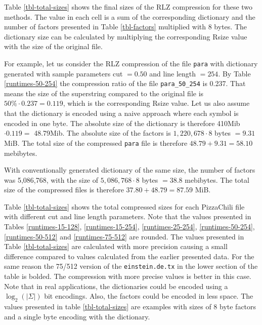 \documentclass[english,twoside,censored,csm,algorithms-track-2020]{HYthesisML}
\theoremstyle{plain}
\theoremstyle{definition}
\numberwithin{testexample}{chapter}
\begin{document}
\vspace{-1cm}
Table \ref{tbl-total-sizes} shows
the final sizes of the RLZ compression for these two methods. The value in each cell is a sum of
the corresponding dictionary and the number of factors presented in Table \ref{tbl-factors} multiplied
with 8 bytes. The dictionary size can be calculated by multiplying the corresponding Rsize value with
the size of the original file.

For example, let us consider the RLZ compression of the file \texttt{para} with dictionary
generated with sample
parameters cut $= 0.50$ and line length $= 254$.
By Table \ref{runtimes-50-254} the compression ratio of the
file \texttt{para\_50\_254} is 0.237. That means the size of the superstring compared to the
original file is $50\% \cdot 0.237 = 0.119$, which is the corresponding Rsize value.
Let us also assume that the dictionary is encoded using a naive approach where each symbol is
encoded in one byte.
The absolute
size of the dictionary is therefore 410Mib $\cdot 0.119 = $ 48.79Mib. The absolute size of the
factors is $1,220,678\cdot 8$ bytes $= 9.31$ MiB. The total size of the compressed \texttt{para}
file is therefore $48.79 + 9.31 = 58.10$ mebibytes.

With conventionally generated dictionary of the same size, the number of factors was 5,086,768,
with the size of $5,086,768\cdot 8$ bytes $= 38.8$ mebibytes. The total size of the compressed
files is therefore $37.80 + 48.79 = 87.59$ MiB.

Table \ref{tbl-total-sizes} shows the total compressed sizes for each PizzaChili file with different
cut and line length parameters. Note that the values presented in Tables \ref{runtimes-15-128},
\ref{runtimes-15-254}, \ref{runtimes-25-254}, \ref{runtimes-50-254}, \ref{runtimes-50-512} and
\ref{runtimes-75-512} are rounded. The values presented in Table \ref{tbl-total-sizes} are
calculated with more precision causing a small difference compared to values calculated from the
earlier presented data. For the same reason the 75/512 version of the \texttt{einstein.de.tx}
in the lower section of the table is bolded. The compression with more precise values is better
in this case. Note that in real applications, the dictionaries could be encoded using a
$\log_2(|\Sigma|)$ bit encodings. Also, the factors could be encoded in less space. The values
presented in table \ref{tbl-total-sizes} are examples with sizes of 8 byte factors and a single
byte encoding with the dictionary.
\end{document}
